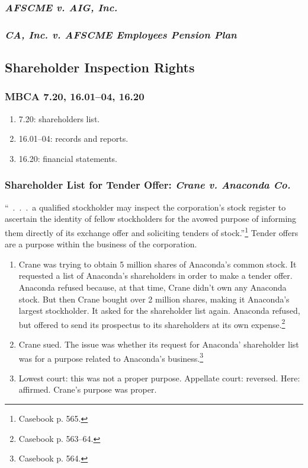 
\subsubsection{\emph{AFSCME v. AIG, Inc.}}


\subsubsection{\emph{CA, Inc. v. AFSCME Employees Pension Plan}}


\subsection{Shareholder Inspection Rights}

\subsubsection{MBCA 7.20, 16.01--04, 16.20}

\begin{enumerate}
    \item 7.20: shareholders list.
    \item 16.01--04: records and reports.
    \item 16.20: financial statements.
\end{enumerate}

\subsubsection{Shareholder List for Tender Offer: \emph{Crane v. Anaconda Co.}}

``~.~.~.~a qualified stockholder may inspect the corporation's stock register to 
ascertain the identity of fellow stockholders for the avowed purpose of 
informing them directly of its exchange offer and soliciting tenders of 
stock.''\footnote{Casebook p. 565.} Tender offers are a purpose within the 
business of the corporation.

\begin{enumerate}
    \item Crane was trying to obtain 5 million shares of Anaconda's common 
    stock. It requested a list of Anaconda's shareholders in order to make a 
    tender offer. Anaconda refused because, at that time, Crane didn't own any 
    Anaconda stock. But then Crane bought over 2 million shares, making it 
    Anaconda's largest stockholder. It asked for the shareholder list again. 
    Anaconda refused, but offered to send its prospectus to its shareholders at 
    its own expense.\footnote{Casebook p.  563--64.}
    \item Crane sued. The issue was whether its request for Anaconda' 
    shareholder list was for a purpose related to Anaconda's 
    business.\footnote{Casebook p. 564.}
    \item Lowest court: this was not a proper purpose. Appellate court: 
    reversed. Here: affirmed. Crane's purpose was proper.
\end{enumerate}

